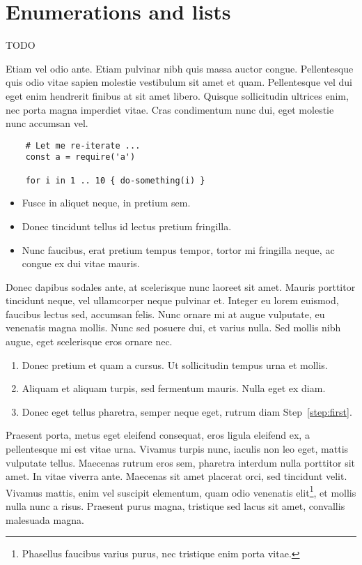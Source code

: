 \section{Enumerations and lists}

TODO

Etiam vel odio ante. Etiam pulvinar nibh quis massa auctor congue. Pellentesque quis odio vitae sapien molestie vestibulum sit amet et quam. Pellentesque vel dui eget enim hendrerit finibus at sit amet libero. Quisque sollicitudin ultrices enim, nec porta magna imperdiet vitae. Cras condimentum nunc dui, eget molestie nunc accumsan vel.

\begin{lstlisting}
	# Let me re-iterate ...
	const a = require('a')
	
	for i in 1 .. 10 { do-something(i) }
\end{lstlisting}


\begin{itemize}
	\item Fusce in aliquet neque, in pretium sem.
	\item Donec tincidunt tellus id lectus pretium fringilla.
	\item Nunc faucibus, erat pretium tempus tempor, tortor mi fringilla neque, ac congue ex dui vitae mauris.
\end{itemize}

Donec dapibus sodales ante, at scelerisque nunc laoreet sit amet. Mauris porttitor tincidunt neque, vel ullamcorper neque pulvinar et. Integer eu lorem euismod, faucibus lectus sed, accumsan felis. Nunc ornare mi at augue vulputate, eu venenatis magna mollis. Nunc sed posuere dui, et varius nulla. Sed mollis nibh augue, eget scelerisque eros ornare nec.

\begin{enumerate}
	\item\label{step:first} Donec pretium et quam a cursus. Ut sollicitudin tempus urna et mollis.
	\item Aliquam et aliquam turpis, sed fermentum mauris. Nulla eget ex diam.
	\item Donec eget tellus pharetra, semper neque eget, rutrum diam Step~\ref{step:first}.
\end{enumerate}

Praesent porta, metus eget eleifend consequat, eros ligula eleifend ex, a pellentesque mi est vitae urna. Vivamus turpis nunc, iaculis non leo eget, mattis vulputate tellus. Maecenas rutrum eros sem, pharetra interdum nulla porttitor sit amet. In vitae viverra ante. Maecenas sit amet placerat orci, sed tincidunt velit. Vivamus mattis, enim vel suscipit elementum, quam odio venenatis elit\footnote{Phasellus faucibus varius purus, nec tristique enim porta vitae.}, et mollis nulla nunc a risus. Praesent purus magna, tristique sed lacus sit amet, convallis malesuada magna. 


